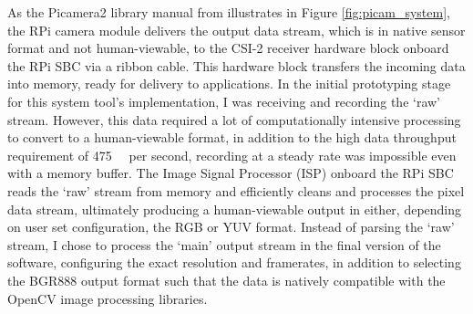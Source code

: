 As the Picamera2 library manual from \cite{raspberrypiltdPicamera2Library2024} illustrates in Figure \ref{fig:picam_system}, the RPi camera module delivers the output data stream, which is in native sensor format and not human-viewable, to the CSI-2 receiver hardware block onboard the RPi SBC via a ribbon cable. This hardware block transfers the incoming data into memory, ready for delivery to applications. In the initial prototyping stage for this system tool's implementation, I was receiving and recording the `raw' stream. However, this data required a lot of computationally intensive processing to convert to a human-viewable format, in addition to the high data throughput requirement of \SI{475}{\mega\byte} per second, recording at a steady rate was impossible even with a memory buffer. The Image Signal Processor (ISP) onboard the RPi SBC reads the `raw' stream from memory and efficiently cleans and processes the pixel data stream, ultimately producing a human-viewable output in either, depending on user set configuration, the RGB or YUV format. Instead of parsing the `raw' stream, I chose to process the `main' output stream in the final version of the software, configuring the exact resolution and framerates, in addition to selecting the BGR888 output format such that the data is natively compatible with the OpenCV image processing libraries.

